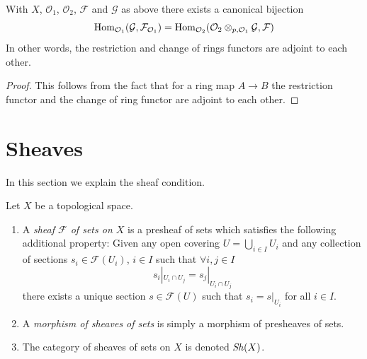 \begin{lemma}
\label{lemma-adjointness-tensor-restrict-presheaves}
With $X$, $\mathcal{O}_1$, $\mathcal{O}_2$, $\mathcal{F}$ and
$\mathcal{G}$ as above there exists a canonical bijection
$$
\mathop{\mathrm{Hom}}\nolimits_{\mathcal{O}_1}(\mathcal{G}, \mathcal{F}_{\mathcal{O}_1})
=
\mathop{\mathrm{Hom}}\nolimits_{\mathcal{O}_2}(
\mathcal{O}_2 \otimes_{p, \mathcal{O}_1} \mathcal{G},
\mathcal{F}
)
$$
In other words, the restriction and change of rings functors
are adjoint to each other.
\end{lemma}

\begin{proof}
This follows from the fact that for a ring map
$A \to B$ the restriction functor and the change
of ring functor are adjoint to each other.
\end{proof}





\section{Sheaves}
\label{section-sheaves}

\noindent
In this section we explain the sheaf condition.

\begin{definition}
\label{definition-sheaf}
\begin{reference}
\cite[Chapter I, \S 1, nos. 1--3, pp. 199--201]{FAC}
\end{reference}
Let $X$ be a topological space.
\begin{enumerate}
\item A {\it sheaf $\mathcal{F}$ of sets on $X$} is a presheaf
of sets which satisfies the following additional property: Given
any open covering $U = \bigcup_{i \in I} U_i$ and any collection
of sections $s_i \in \mathcal{F}(U_i)$, $i \in I$ such that
$\forall i, j\in I$
$$
s_i|_{U_i \cap U_j} = s_j|_{U_i \cap U_j}
$$
there exists a unique section $s \in \mathcal{F}(U)$ such that
$s_i = s|_{U_i}$ for all $i \in I$.
\item A {\it morphism of sheaves of sets} is simply a
morphism of presheaves of sets.
\item The category of sheaves of sets on $X$ is denoted
$\mathop{\mathit{Sh}}\nolimits(X)$.
\end{enumerate}
\end{definition}

